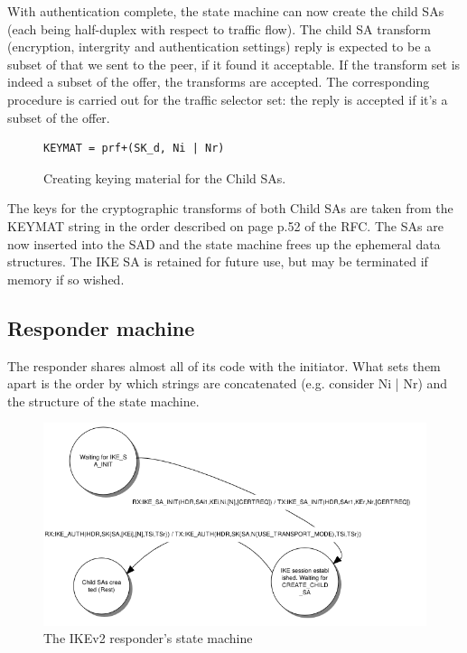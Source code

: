 \documentclass[final,a4paper,twoside,11pt,onecolumn]{report}
\begin{document}
With authentication complete, the state machine can now create the child SAs (each being half-duplex with respect to traffic flow). The child SA transform (encryption, intergrity and authentication settings) reply is expected to be a subset of that we sent to the peer, if it found it acceptable. If the transform set is indeed a subset of the offer, the transforms are accepted. The corresponding procedure is carried out for the traffic selector set: the reply is accepted if it's a subset of the offer.

\begin{figure}[h]
\centering
\begin{verbatim}
KEYMAT = prf+(SK_d, Ni | Nr)
\end{verbatim}
\label{fig:child-keymat}
\caption{Creating keying material for the Child SAs.}
\end{figure}

The keys for the cryptographic transforms of both Child SAs are taken from the KEYMAT string in the order described on page p.52 of the RFC. The SAs are now inserted into the SAD and the state machine frees up the ephemeral data structures. The IKE SA is retained for future use, but may be terminated if memory if so wished.

\subsection{Responder machine}
The responder shares almost all of its code with the initiator. What sets them apart is the order by which strings are concatenated (e.g. consider Ni | Nr) and the structure of the state machine.


\begin{figure}[h]
   \includegraphics[width=1.0\textwidth]{fsm/responder_mealy}
   \caption{The IKEv2 responder's state machine}
   \label{fig:responder-machine}
\end{figure}
\end{document}
